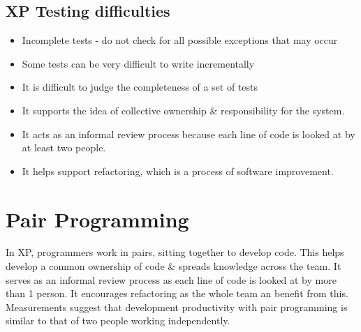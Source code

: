 \documentclass{report}
\begin{document}
\subsection{XP Testing difficulties}
\begin{itemize}
  \item Incomplete tests - do not check for all possible exceptions that may occur
  \item Some tests can be very difficult to write incrementally
  \item It is difficult to judge the completeness of a set of tests
  \item It supports the idea of collective ownership \& responsibility for the system.
  \item It acts as an informal review process because each line of code is looked at by at least two people.
  \item It helps support refactoring, which is a process of software improvement.
\end{itemize}

\section{Pair Programming}
\noindent In XP, programmers work in pairs, sitting together to develop code. This helps develop a common ownership of code \& spreads knowledge across the team. It serves as an informal review process as each line of code is looked at by more than 1 person. It encourages refactoring as the whole team an benefit from this. Measurements suggest that development productivity with pair programming is similar to that of two people working independently.

\newpage
\end{document}
